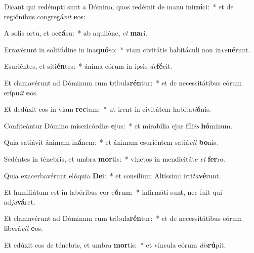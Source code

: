 \item Dicant qui redémpti sunt a Dómino, quos redémit de manu ini\textbf{mí}ci:~* et de regiónibus congregá\textit{vit} \textbf{e}os:
\item A solis ortu, et oc\textbf{cá}su:~* ab aquilóne, \textit{et} \textbf{ma}ri.
\item Erravérunt in solitúdine in ina\textbf{quó}so:~* viam civitátis habitáculi non in\textit{ve}\textbf{né}runt.
\item Esuriéntes, et siti\textbf{én}tes:~* ánima eórum in ipsis \textit{de}\textbf{fé}cit.
\item Et clamavérunt ad Dóminum cum tribula\textbf{rén}tur:~* et de necessitátibus eórum erípu\textit{it} \textbf{e}os.
\item Et dedúxit eos in viam \textbf{rec}tam:~* ut irent in civitátem habita\textit{ti}\textbf{ó}nis.
\item Confiteántur Dómino misericórdiæ \textbf{e}jus:~* et mirabília ejus fíli\textit{is} \textbf{hó}minum.
\item Quia satiávit ánimam in\textbf{á}nem:~* et ánimam esuriéntem satiá\textit{vit} \textbf{bo}nis.
\item Sedéntes in ténebris, et umbra \textbf{mor}tis:~* vinctos in mendicitáte \textit{et} \textbf{fer}ro.
\item Quia exacerbavérunt elóquia \textbf{De}i:~* et consílium Altíssimi irri\textit{ta}\textbf{vé}runt.
\item Et humiliátum est in labóribus cor e\textbf{ó}rum:~* infirmáti sunt, nec fuit qui ad\textit{ju}\textbf{vá}ret.
\item Et clamavérunt ad Dóminum cum tribula\textbf{rén}tur:~* et de necessitátibus eórum liberá\textit{vit} \textbf{e}os.
\item Et edúxit eos de ténebris, et umbra \textbf{mor}tis:~* et víncula eórum \textit{dis}\textbf{rú}pit.
